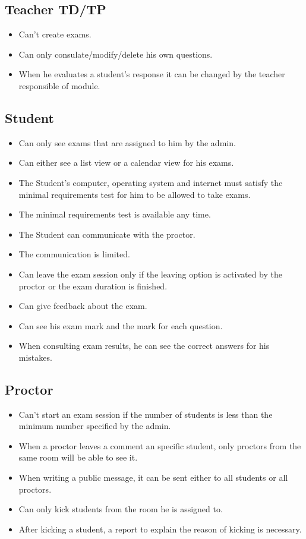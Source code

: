 \documentclass[]{uc2pfecaneva}
\begin{document}
\raggedright\subsection{Teacher TD/TP}
\begin{itemize}
	\item Can’t create exams.
	\item Can only consulate/modify/delete his own questions.
	\item When he evaluates a student’s response it can be changed by the teacher responsible of module.
\end{itemize}

\raggedright\subsection{Student}
\begin{itemize}
	\item Can only see exams that are assigned to him by the admin.
	\item Can either see a list view or a calendar view for his exams.
	\item The Student’s computer, operating system and internet  must satisfy the minimal requirements test for him to be allowed to take exams.
	\item The  minimal requirements test is available any time.
	\item The Student can communicate with the proctor.
	\item The communication is limited.
	\item Can leave the exam session only if the leaving option is activated by the proctor or the exam duration is finished.
	\item Can give feedback about the exam.
	\item Can see his exam mark and the mark for each question.
	\item When consulting exam results, he can see the correct answers for his mistakes.
\end{itemize}

\raggedright\subsection{Proctor}
\begin{itemize}
\item Can’t start an exam session if the number of students is less than the minimum number specified by the admin.
\item When a proctor leaves a comment an specific student, only proctors from the same room will be able to see it.
\item When writing a public message, it can be sent either to all students or all proctors.
\item Can only kick students from the room he is assigned to.
\item After kicking a student, a report to explain the reason of kicking is necessary.
\end{itemize}
\end{document}

